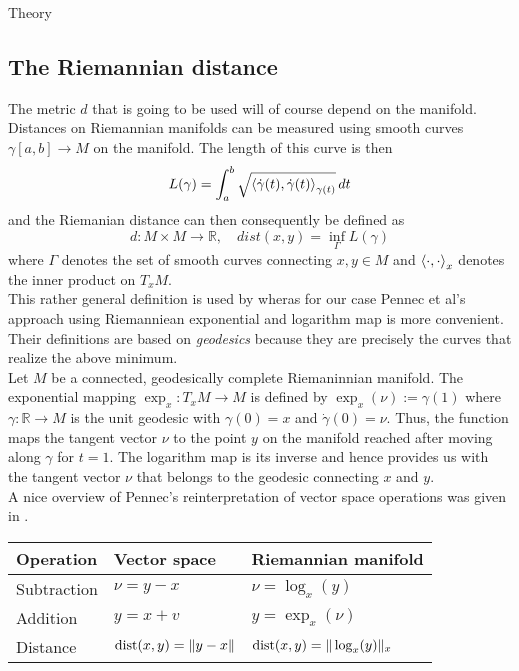 \begin{chapter}{Theory}
\subsection{The Riemannian distance} %
\label{sub:RiemannianDistance}
The metric $d$ that is going to be used will of course depend on the manifold. Distances on Riemannian manifolds can be measured using smooth curves
$\gamma [a,b]\to M$ on the manifold. The length of this curve is then
\begin{equation}
    L(\gamma) =\int_{a}^b\sqrt{\left\langle \dot{\gamma}(t),\dot{\gamma}(t) \right\rangle_{\gamma(t)}}\mathop{dt}
\end{equation}
and the Riemanian distance can then consequently be defined as
\begin{equation}
    d: M\times M\to \mathbb{R},\quad dist(x,y)=\operatorname{inf}_{\Gamma}L(\gamma)
\end{equation}
where $\Gamma$ denotes the set of smooth curves connecting $x,y\in M$ and $\left\langle \cdot,\cdot \right\rangle_x$ denotes the inner product on $T_xM$.\\

This rather general definition is used by \cite{AbsilOptim} wheras for our
case Pennec et al's \cite{Arsigny} approach using Riemanniean exponential and logarithm map is more convenient. Their definitions are based on
\emph{geodesics} because they are precisely the curves that realize the above minimum.\\

Let $M$ be a connected, geodesically complete Riemaninnian manifold. The exponential mapping $\exp_x:T_xM\to M$ is defined by $\exp_x(\nu):=\gamma(1)$
where $\gamma:\mathbb{R}\to M$ is the unit geodesic with $\gamma(0)=x$ and $\dot{\gamma}(0)=\nu$.
Thus, the function maps the tangent vector $\nu$ to the point $y$ on the manifold reached after moving along $\gamma$ for $t=1$.
The logarithm map is its inverse and hence provides us with the tangent vector $\nu$ that belongs to the geodesic connecting $x$ and $y$. \\

A nice overview of Pennec's reinterpretation of vector space operations was given in \cite{mara}.

\begin{table}[h!]
\centering
\begin{tabular}{|l|l|l|}
\hline
Operation   & Vector space &	Riemannian manifold \\
\hline
Subtraction & $\nu=y-x$	& $\nu=\log_x(y)$	\\
Addition    & $y=x+v$	& $y=\exp_x(\nu)$	\\
Distance    & $\operatorname{dist}(x,y)=\| y-x \|$	& $ \operatorname{dist}(x,y)=\| \log_x(y) \|_x$ \\
\hline
\end{tabular}
\end{table}


\end{chapter}
